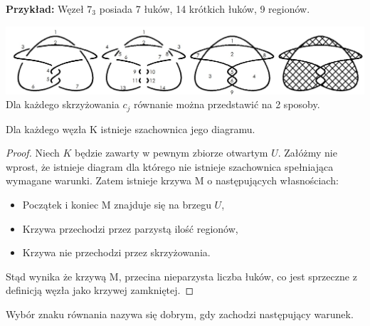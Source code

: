 \textbf{Przykład:} Węzeł $7_{3}$ posiada 7 łuków, 14 krótkich łuków, 9 regionów.

			\includegraphics[scale=0.3]{2/Obrazy/ArcRegion3} \\


Dla każdego skrzyżowania $c_{j}$ równanie można przedstawić na 2 sposoby. 
\begin{lemat}
Dla każdego węzła K istnieje szachownica jego diagramu.  
\end{lemat}
\begin{proof}
Niech $K$ będzie zawarty w pewnym zbiorze otwartym $U$. Załóżmy nie wprost, że istnieje diagram dla którego nie istnieje szachownica spełniająca wymagane warunki. Zatem istnieje krzywa M o następujących własnościach:

\begin{itemize}
\item Początek i koniec M znajduje się na brzegu $U$,
\item Krzywa przechodzi przez parzystą ilość regionów,
\item Krzywa nie przechodzi przez skrzyżowania.
\end{itemize}

Stąd wynika że krzywą M, przecina nieparzysta liczba łuków, co jest sprzeczne z definicją węzła jako krzywej zamkniętej.

\end{proof}

\begin{definicja}
Wybór znaku równania nazywa się dobrym, gdy zachodzi następujący warunek. 
\end{definicja}

